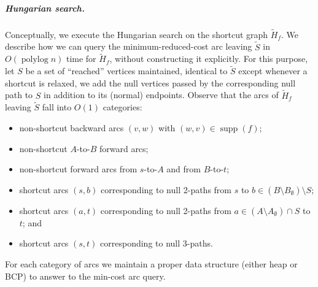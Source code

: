 \documentclass[a4paper,UKenglish]{socg-lipics-v2018}
\makeatletter
\def\polylog{\mathop{\mathrm{polylog}}}
\def\eps{\varepsilon}
\DeclareMathOperator*{\argmin}{arg\,min}
\def\fsupply{\phi}
\def\supp{\operatorname{supp}}
\theoremstyle{plain}
\numberwithin{figure}{section}
\renewcommand{\paragraph}{\subparagraph}
\def\EMPH#1{\textcolor{BrickRed}{{\emph{#1}}}}
\def\n@te#1{\textsf{\boldmath \textbf{$\langle\!\langle$#1$\rangle\!\rangle$}}\leavevmode}
\def\note#1{\textcolor{red}{\n@te{#1}}}
\renewcommand{\note}[1]{} %
\makeatother
\begin{document}
\paragraph{Hungarian search.}
%
%
Conceptually, we execute the Hungarian search
on the shortcut graph $\tilde{H}_f$.
We describe how we can query the minimum-reduced-cost arc leaving $\tilde{S}$ in
$O(\polylog n)$ time for $\tilde{H}_f$, without constructing it explicitly.
For this purpose, let \EMPH{$S$} be a set of ``reached'' vertices maintained,
identical to $\tilde{S}$ except whenever a shortcut is relaxed, we add the null vertices passed by the corresponding null path to $S$ in addition to its (normal) endpoints.
%
Observe that the arcs of $\tilde{H}_f$ leaving $\tilde{S}$ fall into $O(1)$ categories:
\begin{itemize}\itemsep=0pt
\item non-shortcut backward arcs $(v, w)$ with $(w, v) \in \supp(f)$;
\item non-shortcut $A$-to-$B$ forward arcs;
\item non-shortcut forward arcs from $s$-to-$A$ and from $B$-to-$t$;
\item shortcut arcs $(s, b)$ corresponding to null 2-paths from $s$ to
	$b \in (B \setminus B_\emptyset) \setminus S$;
\item shortcut arcs $(a, t)$ corresponding to null 2-paths from
	$a \in (A \setminus A_\emptyset) \cap S$ to $t$; and
\item shortcut arcs $(s, t)$ corresponding to null 3-paths.
\end{itemize}
For each category of arcs we maintain a proper data structure (either heap or BCP) to answer to the min-cost arc query.
\end{document}
